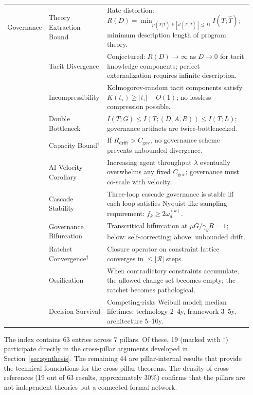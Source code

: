 \documentclass[11pt, a4paper]{googledeepmind}
\begin{document}
\begin{appendices}
\begin{longtable}{p{1.6cm}p{3.2cm}p{7.8cm}}
Governance
    & Theory Extraction Bound & Rate-distortion: $R(D) = \min_{p(\hat{T}|T): \mathbb{E}[d(T,\hat{T})] \leq D} I(T;\hat{T})$; minimum description length of program theory. \\
    & Tacit Divergence & Conjectured: $R(D) \to \infty$ as $D \to 0$ for tacit knowledge components; perfect externalization requires infinite description. \\
    & Incompressibility & Kolmogorov-random tacit components satisfy $K(t_\tau) \geq |t_\tau| - O(1)$; no lossless compression possible. \\
    & Double Bottleneck & $I(T;G) \leq I(T;(D,A,R)) \leq I(T;L)$; governance artifacts are twice-bottlenecked. \\
    & Capacity Bound$^\dagger$ & If $R_{\text{drift}} > C_{\text{gov}}$, no governance scheme prevents unbounded divergence. \\
    & AI Velocity Corollary & Increasing agent throughput $\lambda$ eventually overwhelms any fixed $C_{\text{gov}}$; governance must co-scale with velocity. \\
    & Cascade Stability & Three-loop cascade governance is stable iff each loop satisfies Nyquist-like sampling requirement: $f_k \geq 2\omega_d^{(k)}$. \\
    & Governance Bifurcation & Transcritical bifurcation at $\mu G / \gamma_g R = 1$; below: self-correcting; above: unbounded drift. \\
    & Ratchet Convergence$^\dagger$ & Closure operator on constraint lattice converges in $\leq |\mathcal{R}|$ steps. \\
    & Ossification & When contradictory constraints accumulate, the allowed change set becomes empty; the ratchet becomes pathological. \\
    & Decision Survival & Competing-risks Weibull model; median lifetimes: technology 2--4y, framework 3--5y, architecture 5--10y. \\

\bottomrule
\end{longtable}
\normalsize

The index contains 63 entries across 7 pillars. Of these, 19 (marked with $\dagger$) participate directly in the cross-pillar arguments developed in Section~\ref{sec:synthesis}. The remaining 44 are pillar-internal results that provide the technical foundations for the cross-pillar theorems. The density of cross-references (19 out of 63 results, approximately 30\%) confirms that the pillars are not independent theories but a connected formal network.


\end{appendices}
\end{document}
